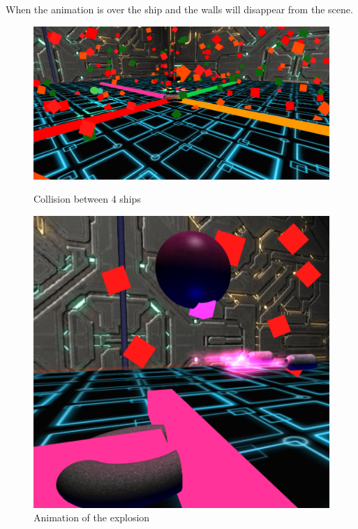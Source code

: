 \documentclass[11pt]{article}
\begin{document}
When the animation is over the ship and the walls will disappear from the scene.

\begin{figure}
	\centering
	\begin{minipage}[b]{0.8\linewidth}
		\includegraphics[width=\linewidth]{collision}
		\caption{Collision between 4 ships}
	\end{minipage}
	\hfill
	\begin{minipage}[b]{0.4\linewidth}
		\includegraphics[width=\linewidth]{explosion}
		\caption{Animation of the explosion}
	\end{minipage}
\end{figure}
\FloatBarrier
\end{document}
